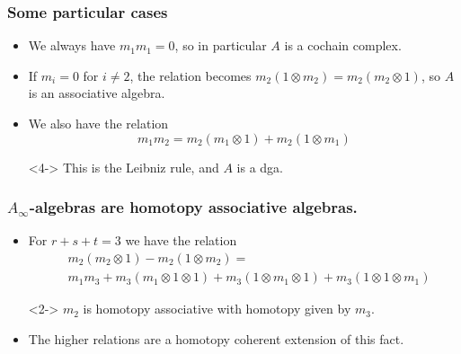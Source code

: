 \documentclass{beamer}
\theoremstyle{definition}
\begin{document}
\begin{frame}
\frametitle{Some particular cases}
\begin{itemize}
\item<1-> We always have $m_1m_1=0$, so in particular $A$ is a cochain complex.%
\item<2-> If $m_i=0$ for $i\neq 2$, the relation becomes $m_2(1\otimes m_2)=m_2(m_2\otimes 1)$, so $A$ is an associative algebra.
\item<3->  We also have the relation \[m_1m_2=m_2(m_1\otimes 1)+m_2(1\otimes m_1)\]%
\item[]<4-> This is the Leibniz rule, and $A$ is a dga.
\end{itemize}
\end{frame}


\begin{frame}
\frametitle{$A_\infty$-algebras are homotopy associative algebras.}
\begin{itemize}
\item<1-> For $r+s+t=3$ we have the relation
\begin{align*}
&m_2(m_2\otimes 1)-m_2(1\otimes m_2)=\\ %
&m_1m_3+m_3(m_1\otimes 1\otimes 1)+m_3(1\otimes m_1\otimes 1)+m_3(1\otimes 1\otimes m_1)
\end{align*}
\item[]<2-> $m_2$ is homotopy associative with homotopy given by $m_3$. %
\item<3-> The higher relations are a homotopy coherent extension of this fact. %
\end{itemize}
\end{frame}
\end{document}
